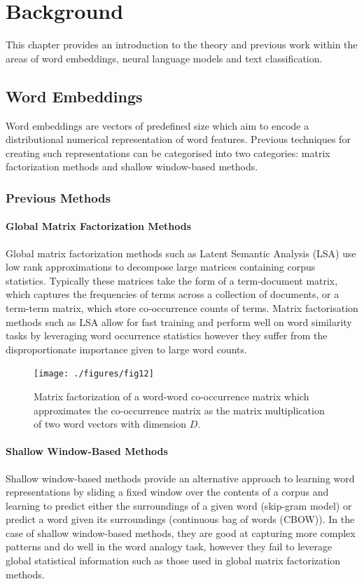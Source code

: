 \chapter{Background}
\label{chap:background}
This chapter provides an introduction to the theory and previous work within the areas of word embeddings, neural language models and text classification. 

\section{Word Embeddings}
Word embeddings are vectors of predefined size which aim to encode a distributional numerical representation of word features. Previous techniques for creating such representations can be categorised into two categories: matrix factorization methods and shallow window-based methods.
\subsection{Previous Methods}
\subsubsection{Global Matrix Factorization Methods}
Global matrix factorization methods such as Latent Semantic Analysis (LSA) use low rank approximations to decompose large matrices containing corpus statistics. Typically these matrices take the form of a term-document matrix, which captures the frequencies of terms across a collection of documents, or a term-term matrix, which store co-occurrence counts of terms. Matrix factorisation methods such as LSA allow for fast training and perform well on word similarity tasks by leveraging word occurrence statistics however they suffer from the disproportionate importance given to large word counts.

\begin{figure}[h]
	\texttt{[image: ./figures/fig12]}
	\centering
	\caption[Matrix factorization of word-word co-occurence matrix]{Matrix factorization of a word-word co-occurrence matrix which approximates the co-occurrence matrix as the matrix multiplication of two word vectors with dimension \(D\). }
	\label{fig:fig12}
\end{figure}
\subsubsection{Shallow Window-Based Methods}
Shallow window-based methods provide an alternative approach to learning word representations by sliding a fixed window over the contents of a corpus and learning to predict either the surroundings of a given word (skip-gram model) or predict a word given its surroundings (continuous bag of words (CBOW)). In the case of shallow window-based methods, they are good at capturing more complex patterns and do well in the word analogy task, however they fail to leverage global statistical information such as those used in global matrix factorization methods.

